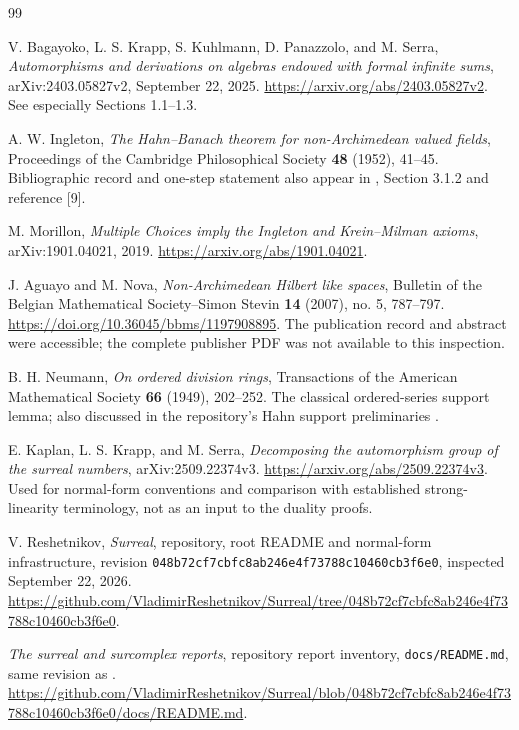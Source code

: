 \documentclass[11pt,letterpaper]{article}
\numberwithin{equation}{section}
\theoremstyle{definition}
\theoremstyle{remark}
\newcommand{\Commit}{048b72cf7cbfc8ab246e4f73788c10460cb3f6e0}
\begin{document}
\begin{thebibliography}{99}
\small\raggedright\setlength{\itemsep}{.25em}
V. Bagayoko, L. S. Krapp, S. Kuhlmann, D. Panazzolo, and M. Serra,
\emph{Automorphisms and derivations on algebras endowed with formal
infinite sums}, arXiv:2403.05827v2, September 22, 2025.
\url{https://arxiv.org/abs/2403.05827v2}.
See especially Sections 1.1--1.3.

A. W. Ingleton, \emph{The Hahn--Banach theorem for non-Archimedean
valued fields}, Proceedings of the Cambridge Philosophical Society
\textbf{48} (1952), 41--45.
Bibliographic record and one-step statement also appear in
\cite{Morillon}, Section 3.1.2 and reference [9].

M. Morillon, \emph{Multiple Choices imply the Ingleton and Krein--Milman
axioms}, arXiv:1901.04021, 2019.
\url{https://arxiv.org/abs/1901.04021}.

J. Aguayo and M. Nova, \emph{Non-Archimedean Hilbert like spaces},
Bulletin of the Belgian Mathematical Society--Simon Stevin
\textbf{14} (2007), no. 5, 787--797.
\url{https://doi.org/10.36045/bbms/1197908895}.
The publication record and abstract were accessible; the complete
publisher PDF was not available to this inspection.

B. H. Neumann, \emph{On ordered division rings}, Transactions of the
American Mathematical Society \textbf{66} (1949), 202--252.
The classical ordered-series support lemma; also discussed in the
repository's Hahn support preliminaries \cite{RepoSpectral}.

E. Kaplan, L. S. Krapp, and M. Serra,
\emph{Decomposing the automorphism group of the surreal numbers},
arXiv:2509.22374v3.
\url{https://arxiv.org/abs/2509.22374v3}.
Used for normal-form conventions and comparison with established
strong-linearity terminology, not as an input to the duality proofs.

V. Reshetnikov, \emph{Surreal}, repository, root README and normal-form
infrastructure, revision \texttt{\Commit}, inspected September 22, 2026.
\url{https://github.com/VladimirReshetnikov/Surreal/tree/048b72cf7cbfc8ab246e4f73788c10460cb3f6e0}.

\emph{The surreal and surcomplex reports}, repository report inventory,
\texttt{docs/README.md}, same revision as \cite{RepoRoot}.
\url{https://github.com/VladimirReshetnikov/Surreal/blob/048b72cf7cbfc8ab246e4f73788c10460cb3f6e0/docs/README.md}.


\end{thebibliography}
\end{document}
